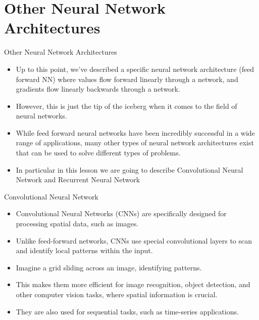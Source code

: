 \documentclass[11pt]{beamer}
\begin{document}
\section{Other Neural Network Architectures}
\begin{frame}{Other Neural Network Architectures}
\begin{itemize}
\item Up to this point, we've described a specific neural network architecture (feed forward NN) where values flow forward linearly through a network, and gradients flow linearly backwards through a network. 

\item However, this is just the tip of the iceberg when it comes to the field of neural networks. 

\item While feed forward neural networks have been incredibly successful in a wide range of applications, many other types of neural network architectures exist that can be used to solve different types of problems. 

\item In particular in this lesson we are going to describe Convolutional Neural Network and Recurrent Neural Network
\end{itemize}
\end{frame}
\begin{frame}{Convolutional Neural Network}
\begin{itemize}
\item Convolutional Neural Networks (CNNs) are specifically designed for processing spatial data, such as images. 

\item Unlike feed-forward networks, CNNs use special convolutional layers to scan and identify local patterns within the input. 

\item Imagine a grid sliding across an image, identifying patterns. 

\item This makes them more efficient for image recognition, object detection, and other computer vision tasks, where spatial information is crucial. 

\item They are also used for sequential tasks, such as time-series applications.
\end{itemize}
\end{frame}
\end{document}
